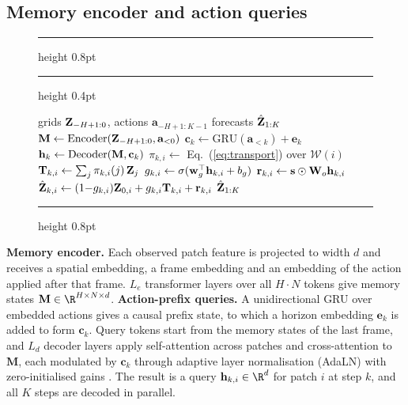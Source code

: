 \subsection{Memory encoder and action queries}
\label{sec:arch}
\begin{figure}
  \vspace{-12pt}\footnotesize
  \setlength{\abovecaptionskip}{0pt}\setlength{\belowcaptionskip}{0pt}
  \captionsetup{justification=raggedright,singlelinecheck=false,labelfont=bf,labelsep=space,skip=0pt}
  \hrule height 0.8pt\vspace{1.5pt}
  \label{alg:shiftwm}
  \vspace{1.5pt}\hrule height 0.4pt\vspace{1.5pt}
  \begin{algorithmic}[1]
    \Require grids $\mathbf{Z}_{-H+1:0}$, actions $\mathbf{a}_{-H+1:K-1}$
    \Ensure forecasts $\hat{\mathbf{Z}}_{1:K}$
    \State $\mathbf{M}\gets\mathrm{Encoder}(\mathbf{Z}_{-H+1:0},\mathbf{a}_{<0})$
      \State $\mathbf{c}_k\gets\mathrm{GRU}(\mathbf{a}_{<k})+\mathbf{e}_k$
      \State $\mathbf{h}_k\gets\mathrm{Decoder}(\mathbf{M},\mathbf{c}_k)$
        \State $\pi_{k,i}\gets$ Eq.~(\ref{eq:transport}) over $\mathcal{W}(i)$
        \State $\mathbf{T}_{k,i}\gets\sum_{j}\pi_{k,i}(j)\,\mathbf{Z}_j$
        \State $g_{k,i}\gets\sigma(\mathbf{w}_g^{\top}\mathbf{h}_{k,i}+b_g)$
        \State $\mathbf{r}_{k,i}\gets\mathbf{s}\odot\mathbf{W}_o\mathbf{h}_{k,i}$
        \State $\hat{\mathbf{Z}}_{k,i}\gets(1{-}g_{k,i})\mathbf{Z}_{0,i}+g_{k,i}\mathbf{T}_{k,i}+\mathbf{r}_{k,i}$
      \EndFor
    \EndFor
    \State \Return $\hat{\mathbf{Z}}_{1:K}$
  \end{algorithmic}
  \vspace{1pt}\hrule height 0.8pt\vspace{-6pt}
\end{figure}
\textbf{Memory encoder.} Each observed patch feature is projected to width $d$ and receives a spatial embedding, a frame
embedding and an embedding of the action applied after that frame.
%
$L_e$ transformer layers over all $H\cdot N$ tokens give memory states $\mathbf{M}\in\R^{H\times N\times d}$.
%
\textbf{Action-prefix queries.} A unidirectional GRU over embedded actions gives a causal prefix state, to which a
horizon embedding $\mathbf{e}_k$ is added to form $\mathbf{c}_k$.
%
Query tokens start from the memory states of the last frame, and $L_d$ decoder layers apply self-attention across
patches and cross-attention to $\mathbf{M}$, each modulated by $\mathbf{c}_k$ through adaptive layer normalisation (AdaLN) with
zero-initialised gains \citep{peebles2023dit}.
%
The result is a query $\h_{k,i}\in\R^d$ for patch $i$ at step $k$, and all $K$ steps are decoded in parallel.

